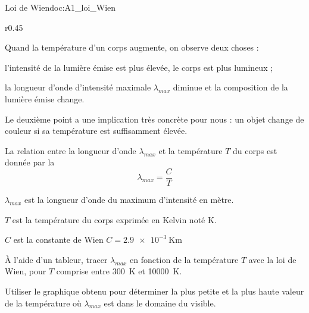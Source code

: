 \begin{doc}{Loi de Wien}{doc:A1_loi_Wien}
  \begin{wrapfigure}[10]{r}{0.45\linewidth}
    \vspace*{-30pt}
    \centering
  \end{wrapfigure}
  
  Quand la température d'un corps augmente, on observe deux choses :
  \begin{listeTirets}
    \item l'intensité de la lumière émise est plus élevée, le corps est plus lumineux ;
    \item la longueur d'onde d'intensité maximale $\lambda_{max}$ diminue et la composition de la lumière émise change.
  \end{listeTirets}
  Le deuxième point a une implication très concrète pour nous : un objet change de couleur si sa température est suffisamment élevée.
  \smallskip

  \begin{encart}
    La relation entre la longueur d'onde $\lambda_{max}$ et la température $T$ du corps est donnée par la 
    \begin{equation*}
      \lambda_{max} = \dfrac{C}{T}
    \end{equation*}
    \begin{listePoints}
      \item $\lambda_{max}$ est la longueur d'onde du maximum d'intensité en mètre.
      \item $T$ est la température du corps exprimée en Kelvin noté \unit{\kelvin}.
      \item $C$ est la constante de Wien $C = \qty{2,9e-3}{\kelvin\m}$
    \end{listePoints}
  \end{encart}
\end{doc}


\mesure
À l'aide d'un tableur, tracer $\lambda_{max}$ en fonction de la température $T$ avec la loi de Wien, pour $T$ comprise entre \qty{300}{\kelvin} et \qty{10000}{\kelvin}.

\mesure
Utiliser le graphique obtenu pour déterminer la plus petite et la plus haute valeur de la température où $\lambda_{max}$ est dans le domaine du visible.

